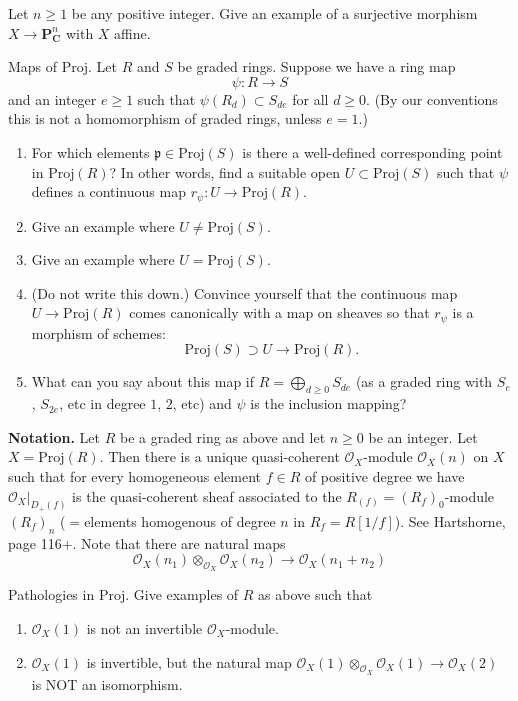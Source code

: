 \begin{exercise}
\label{exercise-affine-onto-projective-space}
Let $n \geq 1$ be any positive integer.
Give an example of a surjective morphism
$X \to {\mathbf P}^n_{\mathbf C}$ with $X$ affine.
\end{exercise}

\begin{exercise}
\label{exercise-morphism-proj}
Maps of $\text{Proj}$. Let $R$ and $S$ be graded rings.
Suppose we have a ring map
$$
\psi : R \to S
$$
and an integer $e \geq 1$ such that $\psi(R_d) \subset S_{de}$
for all $d \geq 0$. (By our conventions this is not a homomorphism
of graded rings, unless $e = 1$.)
\begin{enumerate}
\item For which elements $\mathfrak p \in \text{Proj}(S)$ is
there a well-defined corresponding point in $\text{Proj}(R)$? In other words,
find a suitable open $U \subset \text{Proj}(S)$ such that $\psi$ defines
a continuous map $r_\psi : U \to \text{Proj}(R)$.
\item Give an example where $U \not = \text{Proj}(S)$.
\item Give an example where $U = \text{Proj}(S)$.
\item (Do not write this down.) Convince yourself that
the continuous map $U \to \text{Proj}(R)$ comes canonically with
a map on sheaves so that $r_\psi$ is a morphism of schemes:
$$
\text{Proj}(S) \supset U \longrightarrow \text{Proj}(R).
$$
\item What can you say about this map if
$R = \bigoplus_{d \geq 0} S_{de}$ (as a graded ring with
$S_e$, $S_{2e}$, etc in degree $1$, $2$, etc) and $\psi$
is the inclusion mapping?
\end{enumerate}
\end{exercise}

\noindent
{\bf Notation.} Let $R$ be a graded ring as above and
let $n \geq 0$ be an integer. Let $X = \text{Proj}(R)$. Then there is a unique
quasi-coherent ${\mathcal O}_X$-module ${\mathcal O}_X(n)$ on $X$ such that
for every homogeneous element $f \in R$ of positive degree we have
${\mathcal O}_X |_{D_{+}(f)}$ is the quasi-coherent sheaf associated to the
$R_{(f)} = (R_f)_0$-module $(R_f)_n$ ($ = $elements homogenous of degree
$n$ in $R_f = R[1/f]$). See Hartshorne, page 116+. Note that there are
natural maps
$$
{\mathcal O}_X(n_1) \otimes_{{\mathcal O}_X} {\mathcal O}_X(n_2)
\longrightarrow
{\mathcal O}_X(n_1 + n_2)
$$

\begin{exercise}
\label{exercise-pathologies-proj}
Pathologies in $\text{Proj}$.
Give examples of $R$ as above such that
\begin{enumerate}
\item ${\mathcal O}_X(1)$ is not an invertible ${\mathcal O}_X$-module.
\item ${\mathcal O}_X(1)$ is invertible, but the
natural map ${\mathcal O}_X(1) \otimes_{{\mathcal O}_X} {\mathcal O}_X(1) \to
{\mathcal O}_X(2)$ is NOT an isomorphism.
\end{enumerate}
\end{exercise}

